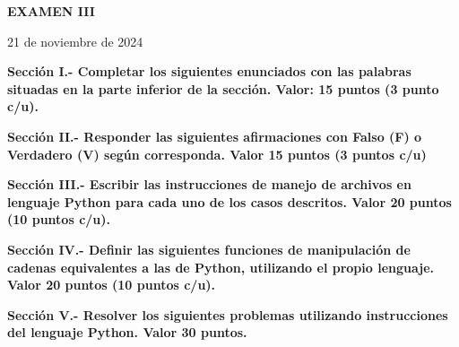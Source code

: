 \documentclass[10pt,addpoints]{exam}
\begin{document}
\begin{center}
  \sffamily\textbf{EXAMEN III}
\end{center}
\begin{flushright}
21 de noviembre de 2024
\end{flushright}

\begin{questions}
\begin{EnvFullwidth}
  \sffamily\textbf{Sección I.- Completar los siguientes enunciados con las
  palabras situadas en la parte inferior de la sección. Valor: 15 puntos
  (3 punto c/u).}
\end{EnvFullwidth}








\end{questions}

\begin{questions}
\begin{EnvFullwidth}
  \sffamily\textbf{Sección II.- Responder las siguientes afirmaciones con
  Falso (F) o Verdadero (V) según corres\-ponda. Valor 15 puntos (3 puntos c/u)}
\end{EnvFullwidth}







\end{questions}


\begin{questions}
\begin{EnvFullwidth}
  \sffamily\textbf{Sección III.- Escribir las instrucciones de manejo de
  archivos en lenguaje Python para cada uno de los casos descritos. Valor 20
  puntos (10 puntos c/u).
  }
\end{EnvFullwidth}



%

\end{questions}

\begin{questions}
\begin{EnvFullwidth}
  \sffamily\textbf{Sección IV.- Definir las siguientes funciones de
  manipulación de cadenas equivalentes a las de Python, utilizando el propio
  lenguaje. Valor 20 puntos (10 puntos c/u).
  }
\end{EnvFullwidth}



%

\end{questions}

\begin{questions}
\begin{EnvFullwidth}
  \sffamily\textbf{Sección V.- Resolver los siguientes problemas utilizando
  instrucciones del lenguaje Python. Valor 30 puntos.
  }
\end{EnvFullwidth}


%
%

\end{questions}
\end{document}
